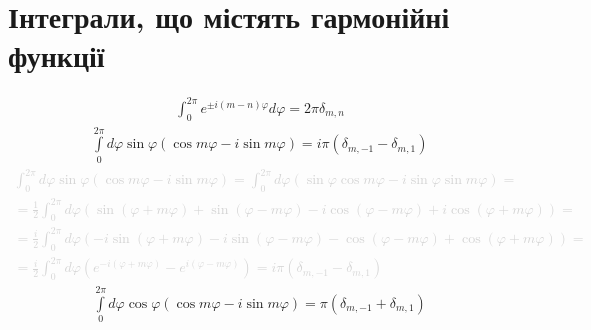 \section{Інтеграли, що містять гармонійні функції}
%
\begin{equation} \begin{aligned}
\int_{0}^{2\pi} e^{\pm i (m-n) \varphi} d \varphi = 2 \pi \delta_{m,n} 
\end{aligned} \end{equation}
%
\begin{equation} \begin{aligned}
\int \limits_{0}^{2\pi} d \varphi \sin \varphi 
\left( \cos m \varphi - i \sin m \varphi \right) = 
i \pi \left( \delta_{m,-1} - \delta_{m,1} \right)
\end{aligned} \end{equation}
%
\textcolor{lightgray}{ \begin{equation*} \begin{aligned}
\int_{0}^{2\pi} d \varphi \sin \varphi 
\left( \cos m \varphi - i \sin m \varphi \right) = \int_{0}^{2\pi} d \varphi
\left( \sin \varphi \cos m \varphi - i \sin \varphi \sin m \varphi \right) = \\
= \frac{1}{2} \int_{0}^{2\pi} d \varphi \left( \sin (\varphi + m \varphi) + 
\sin (\varphi - m \varphi) - i \cos (\varphi - m \varphi) + 
i \cos (\varphi + m \varphi) \right) = \\
= \frac{i}{2} \int_{0}^{2\pi} d \varphi \left( -i \sin (\varphi + m \varphi) -
i \sin (\varphi - m \varphi) - \cos (\varphi - m \varphi) + 
\cos (\varphi + m \varphi) \right) = \\
= \frac{i}{2} \int_{0}^{2\pi} d \varphi \left( e^{-i (\varphi + m \varphi)} - 
e^{i (\varphi - m \varphi)} \right) = 
i \pi \left( \delta_{m,-1} - \delta_{m,1} \right)
\end{aligned} \end{equation*} }
%
\begin{equation} \begin{aligned}
\int \limits_{0}^{2\pi} d \varphi \cos \varphi 
( \cos m \varphi - i \sin m \varphi) = \pi ( \delta_{m,-1} + \delta_{m,1} )
\end{aligned} \end{equation}
%
